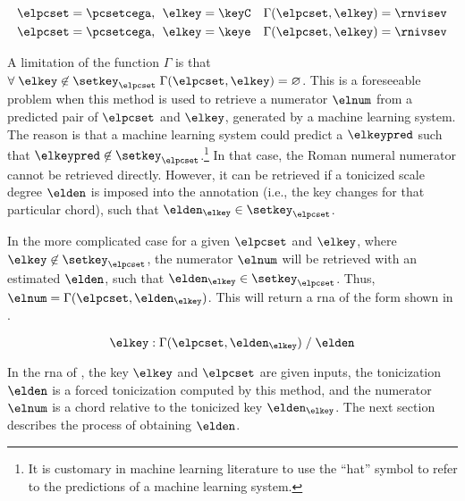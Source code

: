 \begin{equation}
    \label{eq:numerator_from_pcset_key}
    \begin{split}
        \elpcset = \pcsetcega \text{, } \; \elkey = \keyC \quad \Gamma(\elpcset, \elkey) = \rnvisev \\
        \elpcset = \pcsetcega \text{, } \; \elkey = \keye \quad \Gamma(\elpcset, \elkey) = \rnivsev \\
    \end{split}
\end{equation}


A limitation of the function $\Gamma$ is that $\forall \;
\elkey \not\in \setkey_\elpcset \; \Gamma(\elpcset, \elkey)
= \varnothing$. This is a foreseeable problem when this
method is used to retrieve a numerator $\elnum$ from a
predicted pair of $\elpcset$ and $\elkey$, generated by a
machine learning system. The reason is that a machine
learning system could predict a $\elkeypred$ such that
$\elkeypred \not\in \setkey_\elpcset$.\footnote{It is
customary in machine learning literature to use the ``hat''
symbol to refer to the predictions of a machine learning
system.} In that case, the Roman numeral numerator cannot be
retrieved directly. However, it can be retrieved if a
tonicized scale degree $\elden$ is imposed into the
annotation (i.e., the key changes for that particular
chord), such that $\elden_{\elkey} \in \setkey_\elpcset$.

In the more complicated case for a given $\elpcset$ and
$\elkey$, where $\elkey \not\in \setkey_\elpcset$, the
numerator $\elnum$ will be retrieved with an estimated
$\elden$, such that $\elden_{\elkey} \in \setkey_\elpcset$.
Thus, $\elnum = \Gamma(\elpcset, \elden_{\elkey})$. This
will return a \gls{rna} of the form shown in
.

\begin{equation}
    \label{eq:numerator_from_pcset_den}
    \elkey \; \text{:} \; \Gamma(\elpcset, \elden_{\elkey}) \; \text{/} \; \elden
\end{equation}

In the \gls{rna} of , the
key $\elkey$ and $\elpcset$ are given inputs, the
tonicization $\elden$ is a forced tonicization computed by
this method, and the numerator $\elnum$ is a chord relative
to the tonicized key $\elden_{\elkey}$. The next section
describes the process of obtaining $\elden$.
